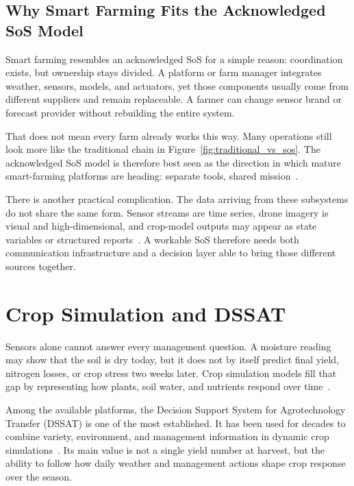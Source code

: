 \subsection{Why Smart Farming Fits the Acknowledged SoS Model}

Smart farming resembles an acknowledged SoS for a simple reason: coordination
exists, but ownership stays divided. A platform or farm manager integrates
weather, sensors, models, and actuators, yet those components usually come from
different suppliers and remain replaceable. A farmer can change sensor brand or
forecast provider without rebuilding the entire system.

That does not mean every farm already works this way. Many operations still look
more like the traditional chain in Figure~\ref{fig:traditional_vs_sos}. The
acknowledged SoS model is therefore best seen as the direction in which mature
smart-farming platforms are heading: separate tools, shared
mission~\cite{krisnawijaya2024architecture, nielsen2015sos}.

There is another practical complication. The data arriving from these subsystems
do not share the same form. Sensor streams are time series, drone imagery is
visual and high-dimensional, and crop-model outputs may appear as state
variables or structured reports~\cite{krisnawijaya2024architecture,
adewuyi2024datascience}. A workable SoS therefore needs both communication
infrastructure and a decision layer able to bring those different sources
together.


\section{Crop Simulation and DSSAT}
\label{sec:dssat}

Sensors alone cannot answer every management question. A moisture reading may
show that the soil is dry today, but it does not by itself predict final yield,
nitrogen losses, or crop stress two weeks later. Crop simulation models fill
that gap by representing how plants, soil water, and nutrients respond over
time~\cite{boote2019cropmodelling}.

Among the available platforms, the Decision Support System for Agrotechnology
Transfer (DSSAT) is one of the most established. It has been used for decades to
combine variety, environment, and management information in dynamic crop
simulations~\cite{hoogenboom2019dssat, sachin2019dssat}. Its main value is not
a single yield number at harvest, but the ability to follow how daily weather
and management actions shape crop response over the season.


